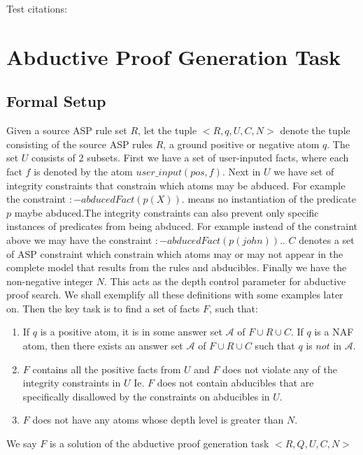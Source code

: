 \documentclass[sigconf]{acmart}
\begin{document}
Test citations: \cite{lim22:_autom_defeas_reason_law,mahajan22:_overv_cclaw_l4}


\section{Abductive Proof Generation Task}\label{sec:abductive_proof}

\subsection{Formal Setup}
Given a source ASP rule set $R$, let the tuple $<R,q,U,C,N>$ denote the tuple consisting of the source ASP rules $R$, a ground positive or negative atom $q$. The set $U$ consists of 2 subsets. First we have a set of user-inputed facts, where each fact $f$ is denoted by the atom $user\_input(pos,f)$. Next in $U$ we have set of integrity constraints that constrain which atoms may be abduced. For example the constraint $:-abducedFact(p(X)).$ means no instantiation of the predicate $p$ maybe abduced.The integrity constraints can also prevent only specific instances of predicates from being abduced. For example instead of the constraint above we may have the constraint $:-abducedFact(p(john)).$.  $C$ denotes a set of ASP constraint which constrain which atoms may or may not appear in the complete model that results from the rules and abducibles. Finally we have the non-negative integer $N$. This acts as the depth control parameter for abductive proof search. We shall exemplify all these definitions with some examples later on. Then the key task is to find a set of facts $F$, such that:

\begin{enumerate}
    \item If $q$ is a positive atom, it is in some answer set $\mathcal{A}$ of $F\cup R\cup C$. If $q$ is a NAF atom, then there exists an answer set $\mathcal{A}$ of $F\cup R\cup C$ such that $q$ is $not$ in $\mathcal{A}$.
    \item $F$ contains all the positive facts from $U$ and $F$ does not violate any of the integrity constraints in $U$ Ie. $F$ does not contain abducibles that are specifically disallowed by the constraints on abducibles in $U$.
    \item $F$ does not have any atoms whose depth level is greater than $N$.
\end{enumerate}
We say $F$ is a solution of the abductive proof generation task $<R,Q,U,C,N>$
\end{document}
